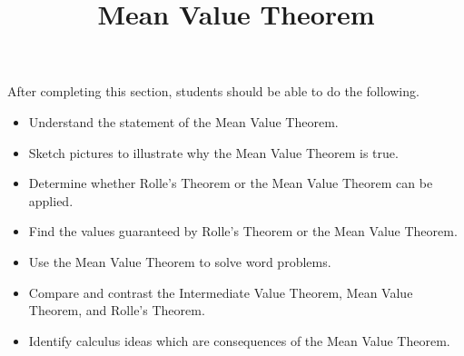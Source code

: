 \documentclass{ximera}
\title{Mean Value Theorem}
\begin{document}
\begin{abstract}
\end{abstract}

\maketitle

\begin{sectionOutcomes}

After completing this section, students should be able to do the following.

\begin{itemize}
	\item Understand the statement of the Mean Value Theorem.
	\item Sketch pictures to illustrate why the Mean Value Theorem is true.
	\item Determine whether Rolle's Theorem or the Mean Value Theorem can be applied.
	\item Find the values guaranteed by Rolle's Theorem or the Mean Value Theorem.
	\item Use the Mean Value Theorem to solve word problems.
	\item Compare and contrast the Intermediate Value Theorem, Mean Value Theorem, and Rolle's Theorem.
	\item Identify calculus ideas which are consequences of the Mean Value Theorem.

\end{itemize}

\end{sectionOutcomes}
\end{document}

